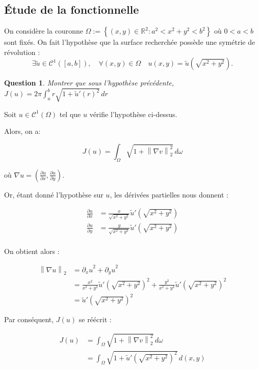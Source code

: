 \documentclass{article}
\newcommand{\Real}{ \mathbb{R} }
\newcommand{\Set}[1]{ \left\{ #1 \right\} }
\newcommand{\FunctionClass}[2]{ \mathcal{C}^{#1} \left( #2 \right) }
\newcommand{\FunctionWithSqrt}[1]{ \sqrt{1 + #1 ^2} }
\newcommand{\Norm}[2]{ \left\| #1 \right\|_{#2} }
\newcommand{\Integral}[4]{ \int_{#1}^{#2} #3 \, d#4 }
\newtheorem{question}{Question}[subsection]
\newenvironment{answer}
  {\color{blue}}
  {}
\newcommand{\QuestionAnswer}[2]{
    \begin{question}
        #1
    \end{question}
    \begin{answer}
        #2
    \end{answer}
}
\begin{document}
\newpage
\subsection{Étude de la fonctionnelle}

On considère la couronne $\Omega := \Set{(x, y) \in \Real^2 : a^2 < x^2 + y^2 < b^2}$ où $0 < a < b$ sont fixés. On fait l'hypothèse que la surface recherchée possède une symétrie de révolution :
$$
\exists \tilde{u} \in \FunctionClass{1}{[a, b]}, \quad \forall (x, y) \in \Omega \quad u(x, y) = \tilde{u}(\sqrt{x^2 + y^2}).
$$

\QuestionAnswer{
    Montrer que sous l'hypothèse précédente,  $J(u) = 2\pi \Integral{a}{b}{ r \FunctionWithSqrt{ \tilde{u}'(r) }}{r}$
}{

    Soit $u \in \FunctionClass{1}{\Omega}$ tel que $u$ vérifie l'hypothèse ci-dessus.
    
    Alors, on a:
    
    \begin{equation}
    J(u) = \Integral{\Omega}{}{\FunctionWithSqrt{\Norm{\nabla v}{2}}}{\omega}
    \end{equation}

    où $\nabla u = \left( \frac{\partial u}{\partial x}, \frac{\partial u}{\partial y} \right)$.

    Or, étant donné l'hypothèse sur $u$, les dérivées partielles nous donnent :

    \begin{align*}
        \frac{\partial u}{\partial x} &= \frac{x}{\sqrt{x^2+y^2}} \tilde{u}'(\sqrt{x^2+y^2}) \\
        \frac{\partial u}{\partial y} &= \frac{y}{\sqrt{x^2+y^2}} \tilde{u}'(\sqrt{x^2+y^2}) \\
    \end{align*}

    On obtient alors :

    \begin{align*}
        \Norm{\nabla u}{2} &= {\partial_x u}^2 + {\partial_y u}^2 \\
            &= \frac{x^2}{x^2+y^2} \tilde{u}'(\sqrt{x^2+y^2})^2 + 
            \frac{y^2}{x^2+y^2} \tilde{u}'(\sqrt{x^2+y^2})^2 \\
            &= \tilde{u}'(\sqrt{x^2+y^2})^2
    \end{align*}

    Par conséquent, $J(u)$ se réécrit :

    \begin{align*}
        J(u) &= \Integral{\Omega}{}{\FunctionWithSqrt{\Norm{\nabla v}{2}}}{\omega} \\
        &= \Integral{\Omega}{}{\FunctionWithSqrt{\tilde{u}'(\sqrt{x^2+y^2})}}{(x,y)}
    \end{align*}

}
\end{document}
